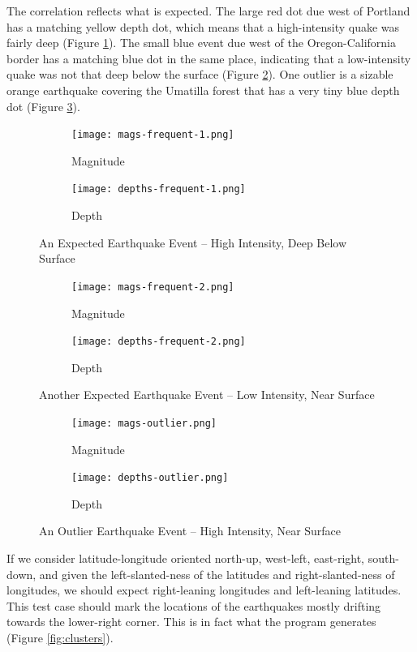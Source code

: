 The correlation reflects what is expected. The large red dot due west of Portland has a matching yellow depth dot, which means that a high-intensity quake was fairly deep (Figure \ref{fig:expected1}). The small blue event due west of the Oregon-California border has a matching blue dot in the same place, indicating that a low-intensity quake was not that deep below the surface (Figure \ref{fig:expected2}). One outlier is a sizable orange earthquake covering the Umatilla forest that has a very tiny blue depth dot (Figure \ref{fig:outlier}).

\begin{figure}[H]
  \centering
  \begin{subfigure}[b]{0.8\linewidth}
    \texttt{[image: mags-frequent-1.png]}
    \caption{Magnitude}
  \end{subfigure}
  \begin{subfigure}[b]{0.8\linewidth}
    \texttt{[image: depths-frequent-1.png]}
    \caption{Depth}
  \end{subfigure}
  \caption{An Expected Earthquake Event -- High Intensity, Deep Below Surface}
  \label{fig:expected1}
\end{figure}

\begin{figure}[H]
  \centering
  \begin{subfigure}[b]{0.8\linewidth}
    \texttt{[image: mags-frequent-2.png]}
    \caption{Magnitude}
  \end{subfigure}
  \begin{subfigure}[b]{0.8\linewidth}
    \texttt{[image: depths-frequent-2.png]}
    \caption{Depth}
  \end{subfigure}
  \caption{Another Expected Earthquake Event -- Low Intensity, Near Surface}
  \label{fig:expected2}
\end{figure}

\begin{figure}[H]
  \centering
  \begin{subfigure}[b]{0.8\linewidth}
    \texttt{[image: mags-outlier.png]}
    \caption{Magnitude}
  \end{subfigure}
  \begin{subfigure}[b]{0.8\linewidth}
    \texttt{[image: depths-outlier.png]}
    \caption{Depth}
  \end{subfigure}
  \caption{An Outlier Earthquake Event -- High Intensity, Near Surface}
  \label{fig:outlier}
\end{figure}

If we consider latitude-longitude oriented north-up, west-left, east-right, south-down, and given the left-slanted-ness of the latitudes and right-slanted-ness of longitudes, we should expect right-leaning longitudes and left-leaning latitudes. This test case should mark the locations of the earthquakes mostly drifting towards the lower-right corner. This is in fact what the program generates (Figure \ref{fig:clusters}).

